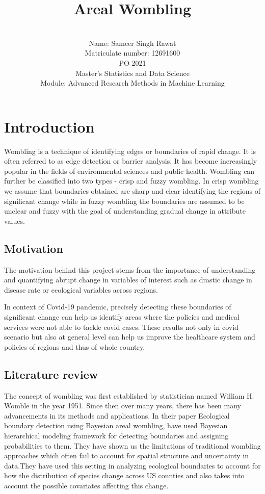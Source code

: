 \documentclass[enabledeprecatedfontcommands,parskip=half,twoside=semi,BCOR=0mm]{scrreprt}
\title{Areal Wombling}
\author{\\
Name: Sameer Singh Rawat\\
Matriculate number: 12691600\\
PO 2021\\
Master's Statistics and Data Science\\
Module: Advanced Research Methods in Machine Learning}
\date{}
\numberwithin{equation}{chapter}
\theoremstyle{definition}
\theoremstyle{remark}
\begin{document}

	
    \maketitle
    
    \tableofcontents
	\newpage
    
    \chapter{Introduction}
    Wombling is a technique of identifying edges or boundaries of rapid change. It is often referred to as edge detection or barrier analysis. It has become increasingly popular in the fields of environmental sciences and public health. Wombling can further be classified into two types - crisp and fuzzy wombling. In crisp wombling we assume that boundaries obtained are sharp and clear identifying the regions of significant change while in fuzzy wombling the boundaries are assumed to be unclear and fuzzy with the goal of understanding gradual change in attribute values.
    
    \section{Motivation}
    The motivation behind this project stems from the importance of understanding and quantifying abrupt change in variables of interest such as drastic change in disease rate or ecological variables across regions.
    
    In context of Covid-19 pandemic, precisely detecting these boundaries of significant change can help us identify areas where the policies and medical services were not able to tackle covid cases. These results not only in covid scenario but also at general level can help us improve the healthcare system and policies of regions and thus of whole country.  
    
    \section{Literature review}
    The concept of wombling was first established by statistician named William H. Womble in the year 1951. Since then over many years, there has been many advancements in its methods and applications. In their paper Ecological boundary detection using Bayesian areal wombling, \cite{Fitzpatrick.2010} have used Bayesian hierarchical modeling framework for detecting boundaries and assigning probabilities to them. They have shown us the limitations of traditional wombling approaches which often fail to account for spatial structure and uncertainty in data.They have used this setting in analyzing ecological boundaries to account for how the distribution of species change across US counties and also takes into account the possible covariates affecting this change.
\end{document}
